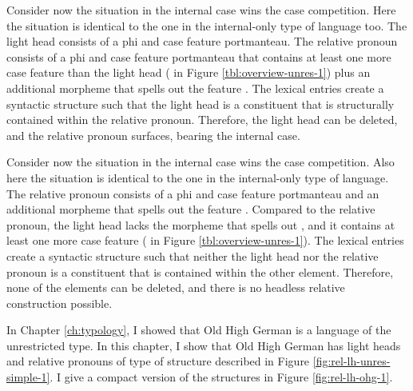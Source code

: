 Consider now the situation in the internal case wins the case competition. Here the situation is identical to the one in the internal-only type of language too. The light head consists of a phi and case feature portmanteau. The relative pronoun consists of a phi and case feature portmanteau that contains at least one more case feature than the light head ( in Figure \ref{tbl:overview-unres-1}) plus an additional morpheme that spells out the feature . The lexical entries create a syntactic structure such that the light head is a constituent that is structurally contained within the relative pronoun. Therefore, the light head can be deleted, and the relative pronoun surfaces, bearing the internal case.

Consider now the situation in the internal case wins the case competition. Also here the situation is identical to the one in the internal-only type of language. The relative pronoun consists of a phi and case feature portmanteau and an additional morpheme that spells out the feature . Compared to the relative pronoun, the light head lacks the morpheme that spells out , and it contains at least one more case feature ( in Figure \ref{tbl:overview-unres-1}). The lexical entries create a syntactic structure such that neither the light head nor the relative pronoun is a constituent that is contained within the other element. Therefore, none of the elements can be deleted, and there is no headless relative construction possible.

In Chapter \ref{ch:typology}, I showed that Old High German is a language of the unrestricted type. In this chapter, I show that Old High German has light heads and relative pronouns of type of structure described in Figure \ref{fig:rel-lh-unres-simple-1}. I give a compact version of the structures in Figure \ref{fig:rel-lh-ohg-1}.

